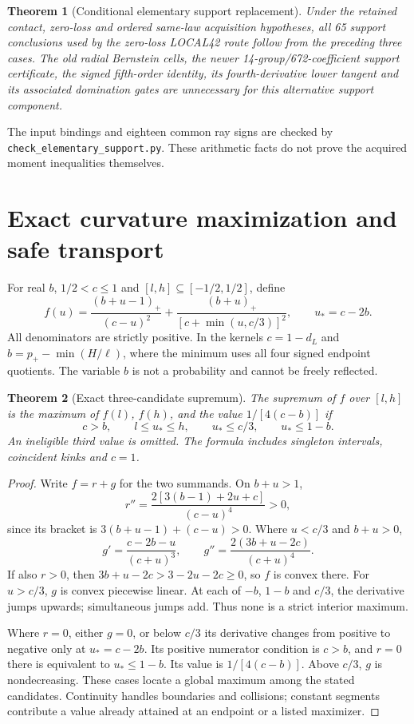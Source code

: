 \documentclass[11pt]{article}
\newtheorem{theorem}{Theorem}
\newcommand{\pos}[1]{(#1)_+}
\begin{document}
\begin{theorem}[Conditional elementary support replacement]
Under the retained contact, zero-loss and ordered same-law acquisition
hypotheses, all 65 support conclusions used by the zero-loss LOCAL42 route
follow from the preceding three cases. The old radial Bernstein cells,
the newer 14-group/672-coefficient support certificate, the signed
fifth-order identity, its fourth-derivative lower tangent and its associated
domination gates are unnecessary for this alternative support component.
\end{theorem}
The input bindings and eighteen common ray signs are checked by
\texttt{check\_elementary\_support.py}. These arithmetic facts do not prove
the acquired moment inequalities themselves.

\section{Exact curvature maximization and safe transport}
For real $b$, $1/2<c\le1$ and $[l,h]\subseteq[-1/2,1/2]$, define
\[
 f(u)=\frac{\pos{b+u-1}}{(c-u)^2}
       +\frac{\pos{b+u}}{[c+\min(u,c/3)]^2},\qquad u_*=c-2b.
\]
All denominators are strictly positive. In the kernels $c=1-d_L$ and
$b=p_+-\min(H/\ell)$, where the minimum uses all four signed endpoint
quotients. The variable $b$ is not a probability and cannot be freely
reflected.

\begin{theorem}[Exact three-candidate supremum]
The supremum of $f$ over $[l,h]$ is the maximum of $f(l)$, $f(h)$, and
the value $1/[4(c-b)]$ if
\[
 c>b,\qquad l\le u_*\le h,\qquad
 u_*\le c/3,\qquad u_*\le1-b.
\]
An ineligible third value is omitted. The formula includes singleton
intervals, coincident kinks and $c=1$.
\end{theorem}
\begin{proof}
Write $f=r+g$ for the two summands. On $b+u>1$,
\[
 r''=\frac{2[3(b-1)+2u+c]}{(c-u)^4}>0,
\]
since its bracket is $3(b+u-1)+(c-u)>0$. Where $u<c/3$ and $b+u>0$,
\[
 g'=\frac{c-2b-u}{(c+u)^3},\qquad
 g''=\frac{2(3b+u-2c)}{(c+u)^4}.
\]
If also $r>0$, then $3b+u-2c>3-2u-2c\ge0$, so $f$ is convex there.
For $u>c/3$, $g$ is convex piecewise linear. At each of
$-b$, $1-b$ and $c/3$, the derivative jumps upwards; simultaneous jumps
add. Thus none is a strict interior maximum.

Where $r=0$, either $g=0$, or below $c/3$ its derivative changes from
positive to negative only at $u_*=c-2b$. Its positive numerator condition
is $c>b$, and $r=0$ there is equivalent to $u_*\le1-b$.
Its value is $1/[4(c-b)]$. Above $c/3$, $g$ is nondecreasing.
These cases locate a global maximum among the stated candidates.
Continuity handles boundaries and collisions; constant segments contribute
a value already attained at an endpoint or a listed maximizer.
\end{proof}
\end{document}
